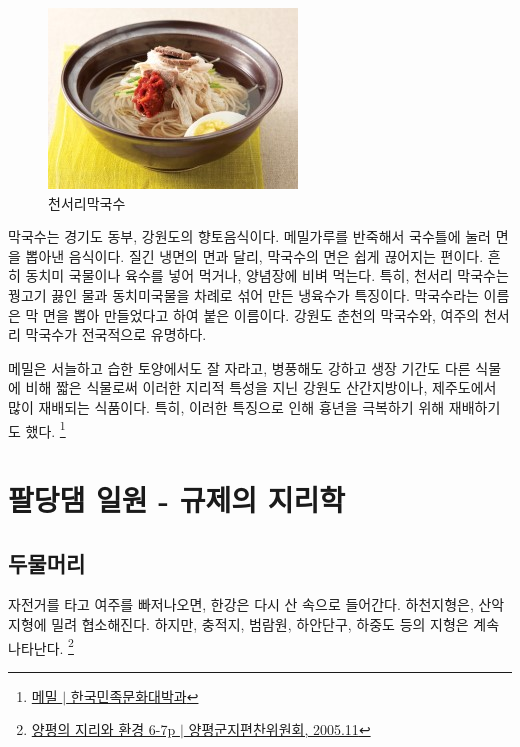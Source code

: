 \begin{figure}[ht]
    \centering
    \includegraphics[width=.6\textwidth]{img/막국수.jpg}
    \caption{천서리막국수\protect\footnotemark}
    \label{fig:my_labe71}
\end{figure}
\footnotetext{\href{https://terms.naver.com/entry.naver?docId=1627391&cid=48179&categoryId=48238}{[천서리막국수 $|$ 전통향토음식 용어사전}}




막국수는 경기도 동부, 강원도의 향토음식이다. 메밀가루를 반죽해서 국수틀에 눌러 면을 뽑아낸 음식이다.
질긴 냉면의 면과 달리, 막국수의 면은 쉽게 끊어지는 편이다.
흔히 동치미 국물이나 육수를 넣어 먹거나, 양념장에 비벼 먹는다.
특히, 천서리 막국수는 꿩고기 끓인 물과 동치미국물을 차례로 섞어 만든 냉육수가 특징이다.
막국수라는 이름은 막 면을 뽑아 만들었다고 하여 붙은 이름이다.
강원도 춘천의 막국수와, 여주의 천서리 막국수가 전국적으로 유명하다.


메밀은 서늘하고 습한 토양에서도 잘 자라고, 병풍해도 강하고 생장 기간도 다른 식물에 비해 짧은 식물로써
이러한 지리적 특성을 지닌 강원도 산간지방이나, 제주도에서 많이 재배되는 식품이다. 특히, 이러한 특징으로 인해
흉년을 극복하기 위해 재배하기도 했다.
\footnote{\href{https://terms.naver.com/entry.naver?docId=545707&cid=46640&categoryId=46640}{메밀 $|$ 한국민족문화대박과}}


\section{팔당댐 일원 - 규제의 지리학}
\subsection{두물머리}
자전거를 타고 여주를 빠저나오면, 한강은 다시 산 속으로 들어간다. 
하천지형은, 산악지형에 밀려 협소해진다. 하지만, 충적지, 범람원, 하안단구, 하중도 등의 지형은 계속 나타난다.
\footnote{\href{https://memory.library.kr/items/show/28910}{양평의 지리와 환경 6-7p $|$ 양평군지편찬위원회, 2005.11}}


